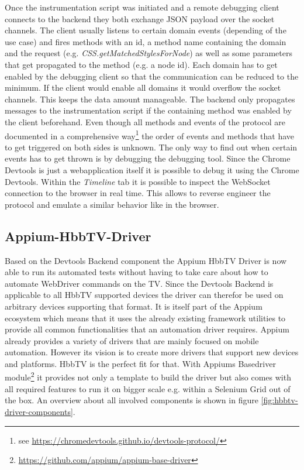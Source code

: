 Once the instrumentation script was initiated and a remote debugging client connects to the backend
they both exchange JSON payload over the socket channels. The client usually listens to certain
domain events (depending of the use case) and fires methods with an id, a method name containing
the domain and the request (e.g. \textit{CSS.getMatchedStylesForNode}) as well as some parameters
that get propagated to the method (e.g. a node id). Each domain has to get enabled by the debugging
client so that the communication can be reduced to the minimum. If the client would enable all
domains it would overflow the socket channels. This keeps the data amount manageable. The backend
only propagates messages to the instrumentation script if the containing method was enabled by
the client beforehand. Even though all methods and events of the protocol are documented in a
comprehensive way\footnote{see \url{https://chromedevtools.github.io/devtools-protocol/}} the order
of events and methods that have to get triggered on both sides is unknown. The only way to find
out when certain events has to get thrown is by debugging the debugging tool. Since the Chrome
Devtools is just a webapplication itself it is possible to debug it using the Chrome Devtools.
Within the \textit{Timeline} tab it is possible to inspect the WebSocket connection to the browser
in real time. This allows to reverse engineer the protocol and emulate a similar behavior like
in the browser.

\subsection{Appium-HbbTV-Driver\label{sec:appiumhbbtvdriver}}

Based on the Devtools Backend component the Appium HbbTV Driver is now able to run its automated
tests without having to take care about how to automate WebDriver commands on the TV. Since the
Devtools Backend is applicable to all HbbTV supported devices the driver can therefor be used on
arbitrary devices supporting that format. It is itself part of the Appium ecosystem which means
that it uses the already existing framework utilities to provide all common functionalities that
an automation driver requires. Appium already provides a variety of drivers that are mainly
focused on mobile automation. However its vision is to create more drivers that support new devices
and platforms. HbbTV is the perfect fit for that. With Appiums Basedriver module\footnote{\url{https://github.com/appium/appium-base-driver}}
it provides not only a template to build the driver but also comes with all required features to
run it on bigger scale e.g. within a Selenium Grid out of the box. An overview about all involved
components is shown in figure \ref{fig:hbbtv-driver-components}.

